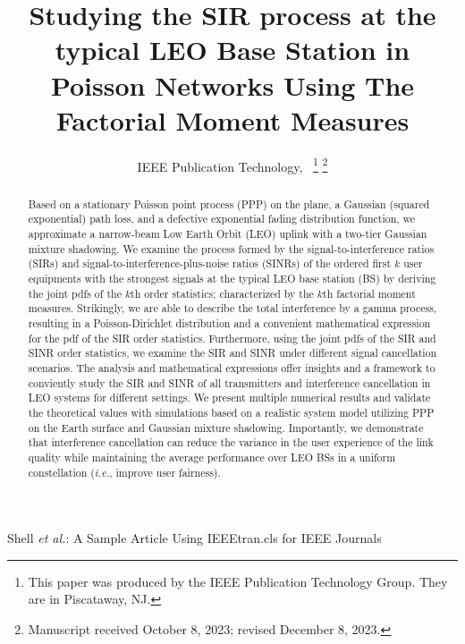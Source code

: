 \documentclass[lettersize,journal]{IEEEtran}
\begin{document}
\title{Studying the SIR process at the typical LEO Base Station in Poisson Networks Using The Factorial Moment Measures}
\author{IEEE Publication Technology,~
\thanks{This paper was produced by the IEEE Publication Technology Group. They are in Piscataway, NJ.}%
\thanks{Manuscript received October 8, 2023; revised December 8, 2023.}}

%
{Shell \MakeLowercase{\textit{et al.}}: A Sample Article Using IEEEtran.cls for IEEE Journals}

\IEEEpubid{}


\maketitle
\begin{abstract}

  Based on a stationary Poisson point process (PPP) on the plane, a Gaussian (squared exponential) path loss, and a defective exponential fading distribution function, we approximate a narrow-beam Low Earth Orbit (LEO) uplink with a two-tier Gaussian mixture shadowing. We examine the process formed by the signal-to-interference ratios (SIRs) and signal-to-interference-plus-noise ratios (SINRs) of the ordered first $k$ user equipments with the strongest signals at the typical LEO base station (BS) by deriving the joint pdfs of the $k$th order statistics; characterized by the $k$th factorial moment measures. Strikingly, we are able to describe the total interference by a gamma process, resulting in a Poisson-Dirichlet distribution and a convenient mathematical expression for the pdf of the SIR order statistics. Furthermore, using the joint pdfs of the SIR and SINR order statistics, we examine the SIR and SINR under different signal cancellation scenarios. The analysis and mathematical expressions offer insights and a framework to conviently study the SIR and SINR of all transmitters and interference cancellation in LEO systems for different settings. We present multiple numerical results and validate the theoretical values with simulations based on a realistic system model utilizing PPP on the Earth surface and Gaussian mixture shadowing. Importantly, we demonstrate that interference cancellation can reduce the variance in the user experience of the link quality while maintaining the average performance over LEO BSs in a uniform constellation (\textit{i.e.}, improve user fairness).


\end{abstract}
\end{document}
